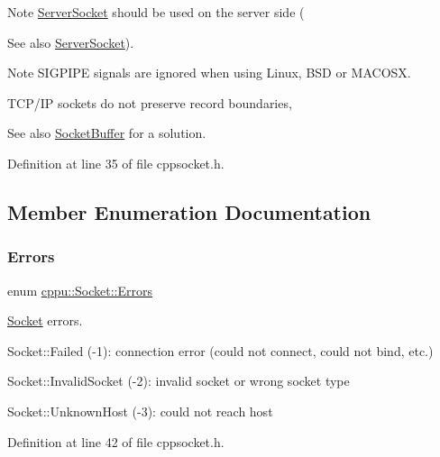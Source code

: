 \begin{DoxyNote}{Note}
\mbox{\hyperlink{classcppu_1_1_server_socket}{Server\+Socket}} should be used on the server side (
\end{DoxyNote}
\begin{DoxySeeAlso}{See also}
\mbox{\hyperlink{classcppu_1_1_server_socket}{Server\+Socket}}). 
\end{DoxySeeAlso}
\begin{DoxyNote}{Note}
S\+I\+G\+P\+I\+PE signals are ignored when using Linux, B\+SD or M\+A\+C\+O\+SX. 

T\+C\+P/\+IP sockets do not preserve record boundaries, 
\end{DoxyNote}
\begin{DoxySeeAlso}{See also}
\mbox{\hyperlink{classcppu_1_1_socket_buffer}{Socket\+Buffer}} for a solution. 
\end{DoxySeeAlso}


Definition at line 35 of file cppsocket.\+h.



\subsection{Member Enumeration Documentation}
\mbox{\label{classcppu_1_1_socket_a49ea5cb079bd7ae97ecf7eb30c9d9e5f}} 
\subsubsection{\texorpdfstring{Errors}{Errors}}
{\footnotesize\ttfamily enum \mbox{\hyperlink{classcppu_1_1_socket_a49ea5cb079bd7ae97ecf7eb30c9d9e5f}{cppu\+::\+Socket\+::\+Errors}}}



\mbox{\hyperlink{classcppu_1_1_socket}{Socket}} errors. 


\begin{DoxyItemize}
\item Socket\+::\+Failed (-\/1)\+: connection error (could not connect, could not bind, etc.)
\item Socket\+::\+Invalid\+Socket (-\/2)\+: invalid socket or wrong socket type
\item Socket\+::\+Unknown\+Host (-\/3)\+: could not reach host 
\end{DoxyItemize}

Definition at line 42 of file cppsocket.\+h.


